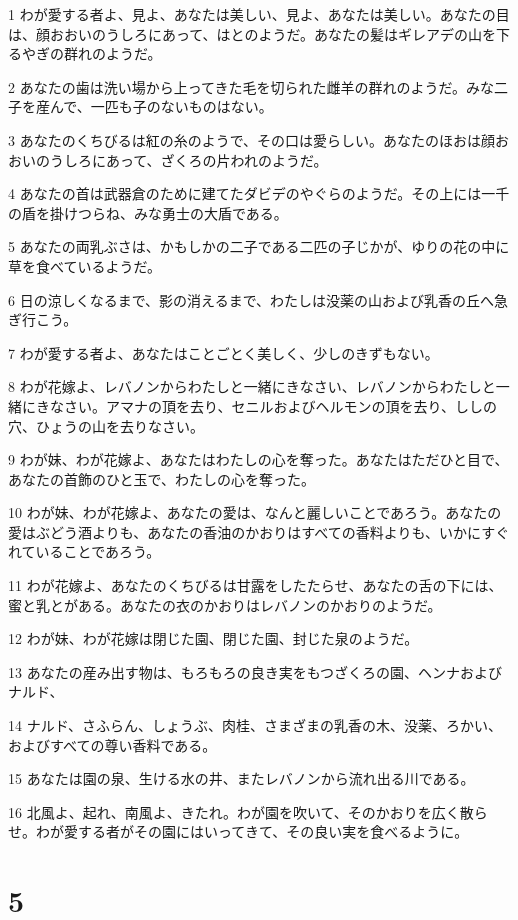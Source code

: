 \par 1 わが愛する者よ、見よ、あなたは美しい、見よ、あなたは美しい。あなたの目は、顔おおいのうしろにあって、はとのようだ。あなたの髪はギレアデの山を下るやぎの群れのようだ。
\par 2 あなたの歯は洗い場から上ってきた毛を切られた雌羊の群れのようだ。みな二子を産んで、一匹も子のないものはない。
\par 3 あなたのくちびるは紅の糸のようで、その口は愛らしい。あなたのほおは顔おおいのうしろにあって、ざくろの片われのようだ。
\par 4 あなたの首は武器倉のために建てたダビデのやぐらのようだ。その上には一千の盾を掛けつらね、みな勇士の大盾である。
\par 5 あなたの両乳ぶさは、かもしかの二子である二匹の子じかが、ゆりの花の中に草を食べているようだ。
\par 6 日の涼しくなるまで、影の消えるまで、わたしは没薬の山および乳香の丘へ急ぎ行こう。
\par 7 わが愛する者よ、あなたはことごとく美しく、少しのきずもない。
\par 8 わが花嫁よ、レバノンからわたしと一緒にきなさい、レバノンからわたしと一緒にきなさい。アマナの頂を去り、セニルおよびヘルモンの頂を去り、ししの穴、ひょうの山を去りなさい。
\par 9 わが妹、わが花嫁よ、あなたはわたしの心を奪った。あなたはただひと目で、あなたの首飾のひと玉で、わたしの心を奪った。
\par 10 わが妹、わが花嫁よ、あなたの愛は、なんと麗しいことであろう。あなたの愛はぶどう酒よりも、あなたの香油のかおりはすべての香料よりも、いかにすぐれていることであろう。
\par 11 わが花嫁よ、あなたのくちびるは甘露をしたたらせ、あなたの舌の下には、蜜と乳とがある。あなたの衣のかおりはレバノンのかおりのようだ。
\par 12 わが妹、わが花嫁は閉じた園、閉じた園、封じた泉のようだ。
\par 13 あなたの産み出す物は、もろもろの良き実をもつざくろの園、ヘンナおよびナルド、
\par 14 ナルド、さふらん、しょうぶ、肉桂、さまざまの乳香の木、没薬、ろかい、およびすべての尊い香料である。
\par 15 あなたは園の泉、生ける水の井、またレバノンから流れ出る川である。
\par 16 北風よ、起れ、南風よ、きたれ。わが園を吹いて、そのかおりを広く散らせ。わが愛する者がその園にはいってきて、その良い実を食べるように。

\chapter{5}

